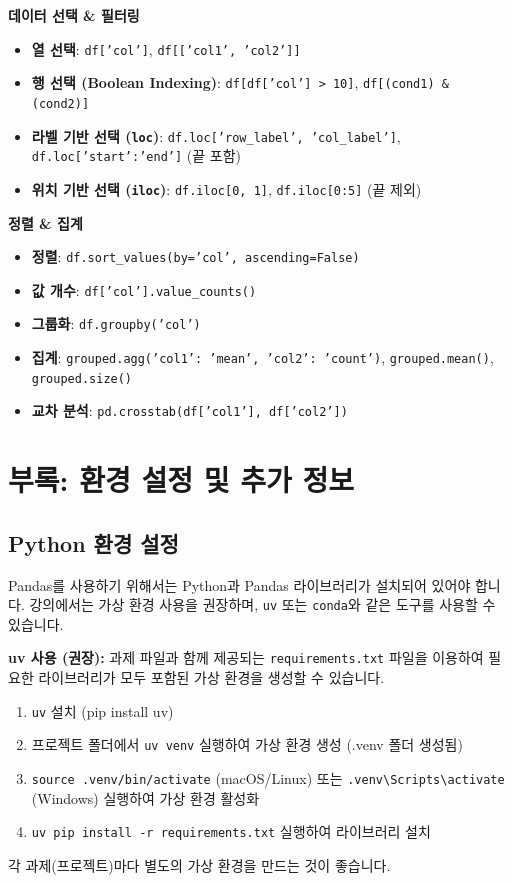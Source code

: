 \documentclass[11pt,a4paper]{book}
\theoremstyle{definition}
\begin{document}
\begin{tcolorbox}[title={Pandas 핵심 요약}]
\textbf{데이터 선택 \& 필터링}
\begin{itemize}
    \item \textbf{열 선택}: \texttt{df['col']}, \texttt{df[['col1', 'col2']]}
    \item \textbf{행 선택 (Boolean Indexing)}: \texttt{df[df['col'] > 10]}, \texttt{df[(cond1) \& (cond2)]}
    \item \textbf{라벨 기반 선택 (\texttt{loc})}: \texttt{df.loc['row\_label', 'col\_label']}, \texttt{df.loc['start':'end']} (끝 포함)
    \item \textbf{위치 기반 선택 (\texttt{iloc})}: \texttt{df.iloc[0, 1]}, \texttt{df.iloc[0:5]} (끝 제외)
\end{itemize}

\textbf{정렬 \& 집계}
\begin{itemize}
    \item \textbf{정렬}: \texttt{df.sort\_values(by='col', ascending=False)}
    \item \textbf{값 개수}: \texttt{df['col'].value\_counts()}
    \item \textbf{그룹화}: \texttt{df.groupby('col')}
    \item \textbf{집계}: \texttt{grouped.agg({'col1': 'mean', 'col2': 'count'})}, \texttt{grouped.mean()}, \texttt{grouped.size()}
    \item \textbf{교차 분석}: \texttt{pd.crosstab(df['col1'], df['col2'])}
\end{itemize}
\end{tcolorbox}


\section{부록: 환경 설정 및 추가 정보}

\subsection{Python 환경 설정}

Pandas를 사용하기 위해서는 Python과 Pandas 라이브러리가 설치되어 있어야 합니다. 강의에서는 가상 환경 사용을 권장하며, \texttt{uv} 또는 \texttt{conda}와 같은 도구를 사용할 수 있습니다.

\textbf{uv 사용 (권장):}
과제 파일과 함께 제공되는 \texttt{requirements.txt} 파일을 이용하여 필요한 라이브러리가 모두 포함된 가상 환경을 생성할 수 있습니다.
\begin{enumerate}
    \item \texttt{uv} 설치 (pip install uv)
    \item 프로젝트 폴더에서 \texttt{uv venv} 실행하여 가상 환경 생성 (.venv 폴더 생성됨)
    \item \texttt{source .venv/bin/activate} (macOS/Linux) 또는 \texttt{.venv\textbackslash Scripts\textbackslash activate} (Windows) 실행하여 가상 환경 활성화
    \item \texttt{uv pip install -r requirements.txt} 실행하여 라이브러리 설치
\end{enumerate}
각 과제(프로젝트)마다 별도의 가상 환경을 만드는 것이 좋습니다.
\end{document}
